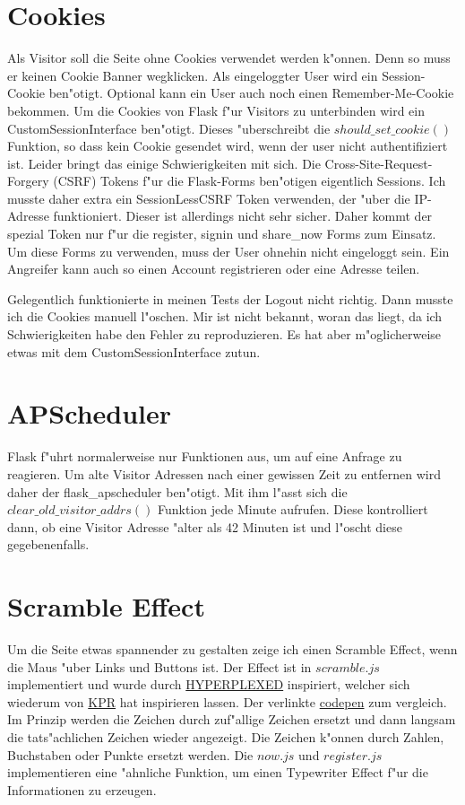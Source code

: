\section{Cookies}\label{sec:cookies}
Als Visitor soll die Seite ohne Cookies verwendet werden k{"o}nnen.
Denn so muss er keinen Cookie Banner wegklicken.
Als eingeloggter User wird ein Session-Cookie ben{"o}tigt.
Optional kann ein User auch noch einen Remember-Me-Cookie bekommen.
Um die Cookies von Flask f{"u}r Visitors zu unterbinden wird ein CustomSessionInterface ben{"o}tigt.
Dieses {"u}berschreibt die $should\_set\_cookie()$ Funktion, so dass kein Cookie gesendet wird, wenn der user nicht authentifiziert ist.
Leider bringt das einige Schwierigkeiten mit sich.
Die Cross-Site-Request-Forgery (CSRF) Tokens f{"u}r die Flask-Forms ben{"o}tigen eigentlich Sessions.
Ich musste daher extra ein SessionLessCSRF Token verwenden, der {"u}ber die IP-Adresse funktioniert.
Dieser ist allerdings nicht sehr sicher.
Daher kommt der spezial Token nur f{"u}r die register, signin und share\_now Forms zum Einsatz.
Um diese Forms zu verwenden, muss der User ohnehin nicht eingeloggt sein.
Ein Angreifer kann auch so einen Account registrieren oder eine Adresse teilen.

Gelegentlich funktionierte in meinen Tests der Logout nicht richtig.
Dann musste ich die Cookies manuell l{"o}schen.
Mir ist nicht bekannt, woran das liegt, da ich Schwierigkeiten habe den Fehler zu reproduzieren.
Es hat aber m{"o}glicherweise etwas mit dem CustomSessionInterface zutun.

\section{APScheduler}\label{sec:ap_scheduler}
Flask f{"u}hrt normalerweise nur Funktionen aus, um auf eine Anfrage zu reagieren.
Um alte Visitor Adressen nach einer gewissen Zeit zu entfernen wird daher der flask\_apscheduler ben{"o}tigt.
Mit ihm l{"a}sst sich die $clear\_old\_visitor\_addrs()$ Funktion jede Minute aufrufen.
Diese kontrolliert dann, ob eine Visitor Adresse {"a}lter als 42 Minuten ist und l{"o}scht diese gegebenenfalls.

\section{Scramble Effect}\label{sec:scramble-effect}
Um die Seite etwas spannender zu gestalten zeige ich einen Scramble Effect, wenn die Maus {"u}ber Links und Buttons ist.
Der Effect ist in $scramble.js$ implementiert und wurde durch \href{https://youtu.be/W5oawMJaXbU}{HYPERPLEXED} inspiriert, welcher sich wiederum von \href{https://kprverse.com}{KPR} hat inspirieren lassen.
Der verlinkte \href{https://codepen.io/Hyperplexed/pen/rNrJgrd'}{codepen} zum vergleich.
Im Prinzip werden die Zeichen durch zuf{"a}llige Zeichen ersetzt und dann langsam die tats{"a}chlichen Zeichen wieder angezeigt.
Die Zeichen k{"o}nnen durch Zahlen, Buchstaben oder Punkte ersetzt werden.
Die $now.js$ und $register.js$ implementieren eine {"a}hnliche Funktion, um einen Typewriter Effect f{"u}r die Informationen zu erzeugen.

